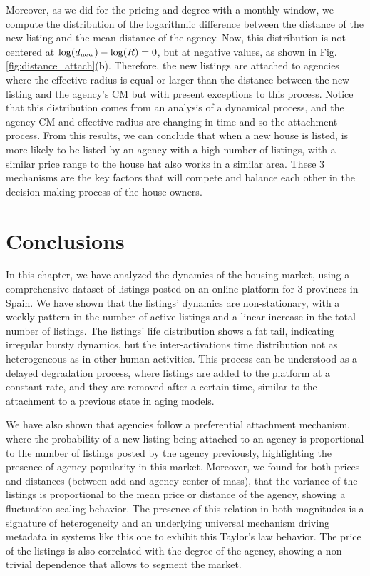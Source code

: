 Moreover, as we did for the pricing and degree with a monthly window, we compute the distribution of the logarithmic difference between the distance of the new listing and the mean distance of the agency. Now, this distribution is not centered at $\log(d_{\rm new}) - \log(R) = 0$, but at negative values, as shown in Fig. \ref{fig:distance_attach}(b). Therefore, the new listings are attached to agencies where the effective radius is equal or larger than the distance between the new listing and the agency's CM but with present exceptions to this process. Notice that this distribution comes from an analysis of a dynamical process, and the agency CM and effective radius are changing in time and so the attachment process. From this results, we can conclude that when a new house is listed, is more likely to be listed by an agency with a high number of listings, with a similar price range to the house hat also works in a similar area. These 3 mechanisms are the key factors that will compete and balance each other in the decision-making process of the house owners.

\section{Conclusions}

In this chapter, we have analyzed the dynamics of the housing market, using a comprehensive dataset of listings posted on an online platform for 3 provinces in Spain. We have shown that the listings' dynamics are non-stationary, with a weekly pattern in the number of active listings and a linear increase in the total number of listings. The listings' life distribution shows a fat tail, indicating irregular bursty dynamics, but the inter-activations time distribution not as heterogeneous as in other human activities. This process can be understood as a delayed degradation process, where listings are added to the platform at a constant rate, and they are removed after a certain time, similar to the attachment to a previous state in aging models. 

We have also shown that agencies follow a preferential attachment mechanism, where the probability of a new listing being attached to an agency is proportional to the number of listings posted by the agency previously, highlighting the presence of agency popularity in this market. Moreover, we found for both prices and distances (between add and agency center of mass), that the variance of the listings is proportional to the mean price or distance of the agency, showing a fluctuation scaling behavior. The presence of this relation in both magnitudes is a signature of heterogeneity and an underlying universal mechanism driving metadata in systems like this one to exhibit this Taylor's law behavior. The price of the listings is also correlated with the degree of the agency, showing a non-trivial dependence that allows to segment the market. 

